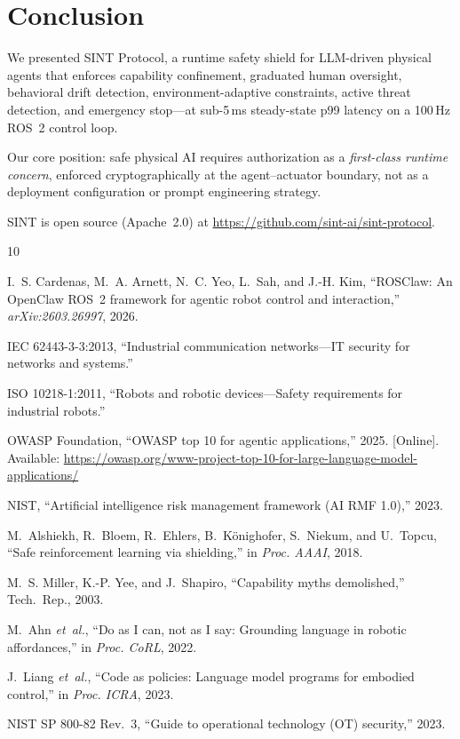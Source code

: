 \documentclass[conference]{IEEEtran}
\begin{document}
\section{Conclusion}
\label{sec:conclusion}

We presented SINT Protocol, a runtime safety shield for LLM-driven physical
agents that enforces capability confinement, graduated human oversight,
behavioral drift detection, environment-adaptive constraints, active threat
detection, and emergency stop---at sub-5\,ms steady-state p99 latency on a
100\,Hz ROS~2 control loop.

Our core position: safe physical AI requires authorization as a
\emph{first-class runtime concern}, enforced cryptographically at the
agent--actuator boundary, not as a deployment configuration or prompt
engineering strategy.

SINT is open source (Apache~2.0) at
\url{https://github.com/sint-ai/sint-protocol}.



\begin{thebibliography}{10}

I.~S. Cardenas, M.~A. Arnett, N.~C. Yeo, L.~Sah, and J.-H. Kim,
``ROSClaw: An OpenClaw ROS~2 framework for agentic robot control and
interaction,'' \emph{arXiv:2603.26997}, 2026.

{IEC 62443-3-3:2013},
``Industrial communication networks---IT security for networks and systems.''

{ISO 10218-1:2011},
``Robots and robotic devices---Safety requirements for industrial robots.''

{OWASP Foundation},
``OWASP top 10 for agentic applications,'' 2025. [Online]. Available:
\url{https://owasp.org/www-project-top-10-for-large-language-model-applications/}

{NIST},
``Artificial intelligence risk management framework (AI RMF 1.0),'' 2023.

M.~Alshiekh, R.~Bloem, R.~Ehlers, B.~K{\"o}nighofer, S.~Niekum, and
U.~Topcu,
``Safe reinforcement learning via shielding,'' in \emph{Proc. AAAI}, 2018.

M.~S. Miller, K.-P. Yee, and J.~Shapiro,
``Capability myths demolished,'' Tech.\ Rep., 2003.

M.~Ahn \emph{et~al.},
``Do as I can, not as I say: Grounding language in robotic affordances,''
in \emph{Proc. CoRL}, 2022.

J.~Liang \emph{et~al.},
``Code as policies: Language model programs for embodied control,''
in \emph{Proc. ICRA}, 2023.

{NIST SP 800-82 Rev.~3},
``Guide to operational technology (OT) security,'' 2023.

\end{thebibliography}
\end{document}

